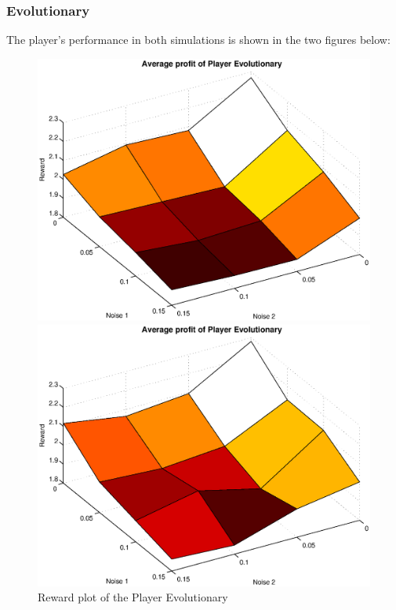 \subsubsection{Evolutionary}
The player's performance in both simulations is shown in the two figures below:
\begin{figure}[h]

\begin{minipage}[hbt]{0.65\textwidth}
	\centering
	\includegraphics[width=\textwidth]{pics/simulation1/Reward_vs_Noise_of_Player_Evolutionary}
\end{minipage}
\hfill
\begin{minipage}[hbt]{0.3\textwidth}
	\centering
	\includegraphics[width=\textwidth]{pics/simulation2/Reward_vs_Noise_of_Player_Evolutionary}
\end{minipage}
	\caption{Reward plot of the Player Evolutionary}
	\label{pic player evo}
\end{figure}

